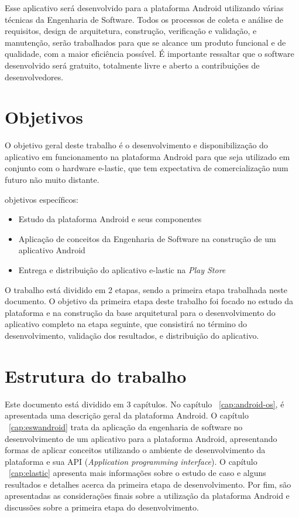 Esse aplicativo será desenvolvido para a plataforma Android utilizando várias técnicas da Engenharia de Software. Todos os processos de coleta e análise de requisitos, design de arquitetura, construção, verificação e validação, e manutenção, serão trabalhados para que se alcance um produto funcional e de qualidade, com a maior eficiência possível. É importante ressaltar que o software desenvolvido será gratuito, totalmente livre e aberto a contribuições de desenvolvedores.
\section{Objetivos}
O objetivo geral deste trabalho é o desenvolvimento e disponibilização do aplicativo em funcionamento na plataforma Android para que seja utilizado em conjunto com o hardware e-lastic, que tem expectativa de comercialização num futuro não muito distante.

objetivos específicos:
\begin{itemize}
\item Estudo da plataforma Android e seus componentes
\item Aplicação de conceitos da Engenharia de Software na construção de um aplicativo Android
\item Entrega e distribuição do aplicativo e-lastic na \textit{Play Store}
\end{itemize}

O trabalho está dividido em 2 etapas, sendo a primeira etapa trabalhada neste documento. O objetivo da primeira etapa deste trabalho foi focado no estudo da plataforma e na construção da base arquitetural para o desenvolvimento do aplicativo completo na etapa seguinte, que consistirá no término do desenvolvimento, validação dos resultados, e distribuição do aplicativo.
\section{Estrutura do trabalho}
Este documento está dividido em 3 capítulos. No capítulo ~\ref{cap:android-os}, é apresentada uma descrição geral da plataforma Android. O capítulo ~\ref{cap:eswandroid} trata da aplicação da engenharia de software no desenvolvimento de um aplicativo para a plataforma Android, apresentando formas de aplicar conceitos utilizando o ambiente de desenvolvimento da plataforma e sua API (\textit{Application programming interface}). O capítulo ~\ref{cap:elastic} apresenta mais informações sobre o estudo de caso e alguns resultados e detalhes acerca da primeira etapa de desenvolvimento. Por fim, são apresentadas as considerações finais sobre a utilização da plataforma Android e discussões sobre a primeira etapa do desenvolvimento.